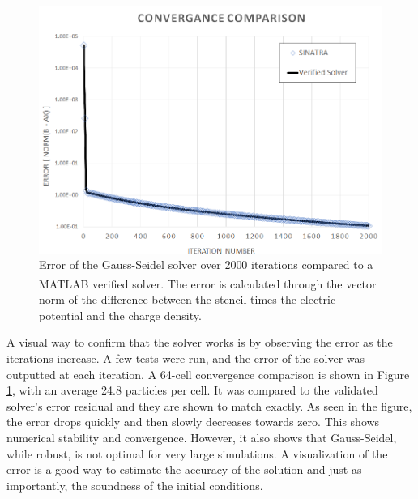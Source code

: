 \begin{figure}
\includegraphics[width=.85\textwidth]{figures/convergance.png}
\centering
\caption[Convergence Visualization]{Error of the Gauss-Seidel solver over 2000 iterations compared to a MATLAB\textsuperscript{\textregistered} verified solver. The error is calculated through the vector norm of the difference between the stencil times the electric potential and the charge density. }
\label{fig:error64}
\end{figure}

\indent A visual way to confirm that the solver works is by observing the error as the iterations increase. A few tests were run, and the error of the solver was outputted at each iteration. A 64-cell convergence comparison is shown in Figure \ref{fig:error64}, with an average 24.8 particles per cell. It was compared to the validated solver's error residual and they are shown to match exactly. As seen in the figure, the error drops quickly and then slowly decreases towards zero. This shows numerical stability and convergence. However, it also shows that Gauss-Seidel, while robust, is not optimal for very large simulations. A visualization of the error is a good way to estimate the accuracy of the solution and just as importantly, the soundness of the initial conditions. 

